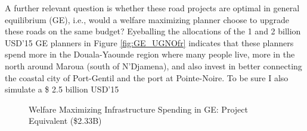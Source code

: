 \documentclass[a4paper]{article}
\begin{document}
A further relevant question is whether these road projects are optimal in general equilibrium (GE), i.e., would a welfare maximizing planner choose to upgrade these roads on the same budget? Eyeballing the allocations of the 1 and 2 billion USD'15 GE planners in Figure \ref{fig:GE_UGNOfr} indicates that these planners spend more in the Douala-Yaounde region where many people live, more in the north around Maroua (south of N'Djamena), and also invest in better connecting the coastal city of Port-Gentil and the port at Pointe-Noire. To be sure I also simulate a \$ 2.5 billion USD'15 

\begin{figure}[H] \vspace{-2mm}
\centering
\caption{\label{fig:GE_UG_Proj} Welfare Maximizing Infrastructure Spending in GE: Project Equivalent (\$2.33B)}
\vspace{2mm}
\end{figure}
\end{document}
